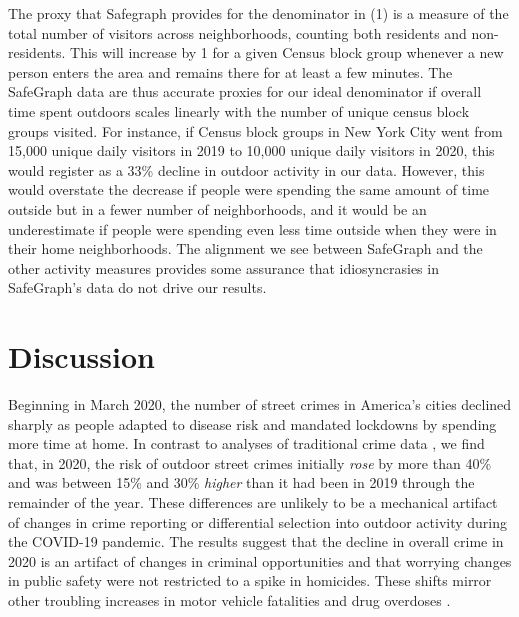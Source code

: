 \documentclass[12pt]{article}
\begin{document}
The proxy that Safegraph provides for the denominator in (1) is a measure of the total number of visitors across neighborhoods, counting both residents and non-residents. This will increase by 1 for a given Census block group whenever a new person enters the area and remains there for at least a few minutes. The SafeGraph data are thus accurate proxies for our ideal denominator if overall time spent outdoors scales linearly with the number of unique census block groups visited. For instance, if Census block groups in New York City went from 15,000 unique daily visitors in 2019 to 10,000 unique daily visitors in 2020, this would register as a 33\% decline in outdoor activity in our data. However, this would overstate the decrease if people were spending the same amount of time outside but in a fewer number of neighborhoods, and it would be an underestimate if people were spending even less time outside when they were in their home neighborhoods. The alignment we see between SafeGraph and the other activity measures provides some assurance that idiosyncrasies in SafeGraph's data do not drive our results.




\section{Discussion}
Beginning in March 2020, the number of street crimes in America's cities declined sharply as people adapted to disease risk and mandated lockdowns by spending more time at home. In contrast to analyses of traditional crime data \citep{abrams2021covid}, we find that, in 2020, the risk of outdoor street crimes initially \emph{rose} by more than 40\% and was between 15\% and 30\% \emph{higher} than it had been in 2019 through the remainder of the year. These differences are unlikely to be a mechanical artifact of changes in crime reporting or differential selection into outdoor activity during the COVID-19 pandemic. 
The results suggest that the decline in overall crime in 2020 is an artifact of changes in criminal opportunities and that worrying changes in public safety were not restricted to a spike in homicides. %
These shifts mirror other troubling increases in motor vehicle fatalities \citep{stewart2022overview} and drug overdoses \citep{stephenson2020drug}.
\end{document}
